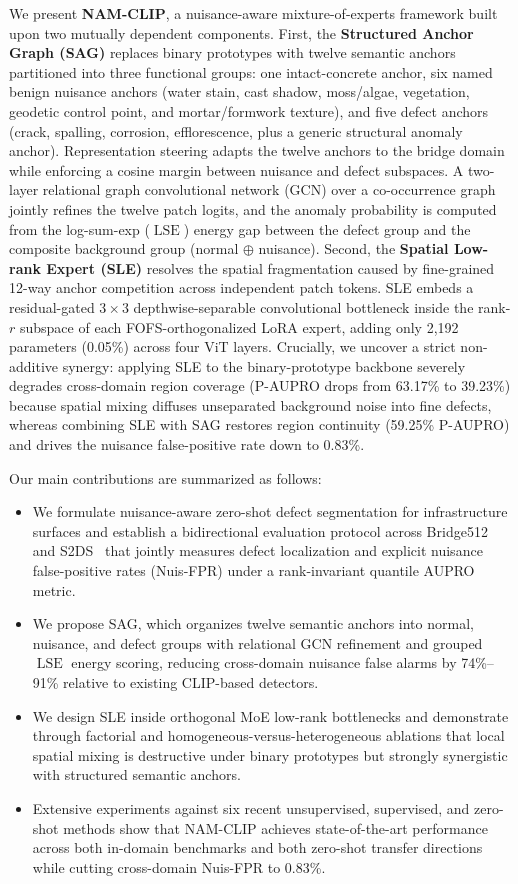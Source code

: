 \documentclass[conference]{IEEEtran}
\newcommand{\method}{NAM-CLIP}
\newcommand{\sag}{SAG}
\newcommand{\sle}{SLE}
\newcommand{\lse}{\operatorname{LSE}}
\begin{document}
We present \textbf{\method{}}, a nuisance-aware mixture-of-experts framework built upon two mutually dependent components. First, the \textbf{Structured Anchor Graph (\sag{})} replaces binary prototypes with twelve semantic anchors partitioned into three functional groups: one intact-concrete anchor, six named benign nuisance anchors (water stain, cast shadow, moss/algae, vegetation, geodetic control point, and mortar/formwork texture), and five defect anchors (crack, spalling, corrosion, efflorescence, plus a generic structural anomaly anchor). Representation steering adapts the twelve anchors to the bridge domain while enforcing a cosine margin between nuisance and defect subspaces. A two-layer relational graph convolutional network (GCN) over a co-occurrence graph jointly refines the twelve patch logits, and the anomaly probability is computed from the log-sum-exp ($\lse$) energy gap between the defect group and the composite background group (normal $\oplus$ nuisance). Second, the \textbf{Spatial Low-rank Expert (\sle{})} resolves the spatial fragmentation caused by fine-grained 12-way anchor competition across independent patch tokens. \sle{} embeds a residual-gated $3{\times}3$ depthwise-separable convolutional bottleneck inside the rank-$r$ subspace of each FOFS-orthogonalized LoRA expert, adding only 2,192 parameters (0.05\%) across four ViT layers. Crucially, we uncover a strict non-additive synergy: applying \sle{} to the binary-prototype backbone severely degrades cross-domain region coverage (P-AUPRO drops from 63.17\% to 39.23\%) because spatial mixing diffuses unseparated background noise into fine defects, whereas combining \sle{} with \sag{} restores region continuity (59.25\% P-AUPRO) and drives the nuisance false-positive rate down to 0.83\%.

Our main contributions are summarized as follows:
\begin{itemize}
\item We formulate nuisance-aware zero-shot defect segmentation for infrastructure surfaces and establish a bidirectional evaluation protocol across Bridge512~\cite{mundt2019codebrim} and S2DS~\cite{benz2022s2ds} that jointly measures defect localization and explicit nuisance false-positive rates (Nuis-FPR) under a rank-invariant quantile AUPRO metric.
\item We propose \sag{}, which organizes twelve semantic anchors into normal, nuisance, and defect groups with relational GCN refinement and grouped $\lse$ energy scoring, reducing cross-domain nuisance false alarms by 74\%--91\% relative to existing CLIP-based detectors.
\item We design \sle{} inside orthogonal MoE low-rank bottlenecks and demonstrate through factorial and homogeneous-versus-heterogeneous ablations that local spatial mixing is destructive under binary prototypes but strongly synergistic with structured semantic anchors.
\item Extensive experiments against six recent unsupervised, supervised, and zero-shot methods show that \method{} achieves state-of-the-art performance across both in-domain benchmarks and both zero-shot transfer directions while cutting cross-domain Nuis-FPR to 0.83\%.
\end{itemize}
\end{document}
